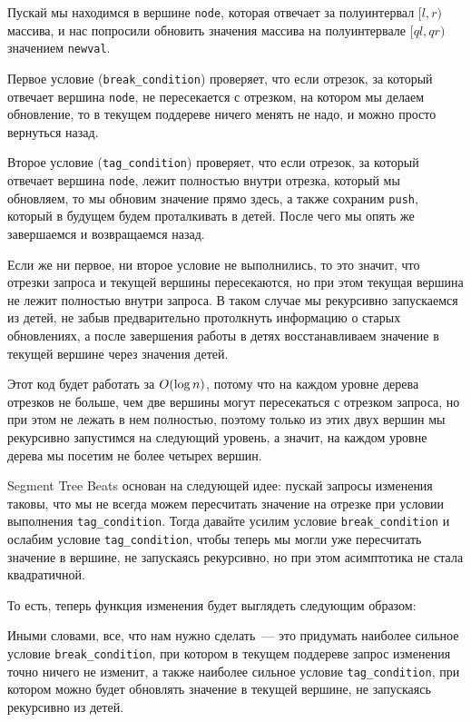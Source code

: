 

Пускай мы находимся в вершине \verb+node+, которая отвечает за полуинтервал $[l, r)$ массива, и нас попросили обновить значения массива на полуинтервале $[ql, qr)$ значением \verb+newval+.

Первое условие (\verb+break_condition+) проверяет, что если отрезок, за который отвечает вершина \verb+node+, не пересекается с отрезком, на котором мы делаем обновление, то в текущем поддереве ничего менять не надо, и можно просто вернуться назад.

Второе условие (\verb+tag_condition+) проверяет, что если отрезок, за который отвечает вершина \verb+node+, лежит полностью внутри отрезка, который мы обновляем, то мы обновим значение прямо здесь, а также сохраним \verb+push+, который в будущем будем проталкивать в детей. После чего мы опять же завершаемся и возвращаемся назад.

Если же ни первое, ни второе условие не выполнились, то это значит, что отрезки запроса и текущей вершины пересекаются, но при этом текущая вершина не лежит полностью внутри запроса. В таком случае мы рекурсивно запускаемся из детей, не забыв предварительно протолкнуть информацию о старых обновлениях, а после завершения работы в детях восстанавливаем значение в текущей вершине через значения детей.

Этот код будет работать за $O(\log n)$, потому что на каждом уровне дерева отрезков не больше, чем две вершины могут пересекаться с отрезком запроса, но при этом не лежать в нем полностью, поэтому только из этих двух вершин мы рекурсивно запустимся на следующий уровень, а значит, на каждом уровне дерева мы посетим не более четырех вершин.

Segment Tree Beats основан на следующей идее: пускай запросы изменения таковы, что мы не всегда можем пересчитать значение на отрезке при условии выполнения \verb+tag_condition+. Тогда давайте усилим условие \verb+break_condition+ и ослабим условие \verb+tag_condition+, чтобы теперь мы могли уже пересчитать значение в вершине, не запускаясь рекурсивно, но при этом асимптотика не стала квадратичной.

То есть, теперь функция изменения будет выглядеть следующим образом:



Иными словами, все, что нам нужно сделать~--- это придумать наиболее сильное условие \verb+break_condition+, при котором в текущем поддереве запрос изменения точно ничего не изменит, а также наиболее сильное условие \verb+tag_condition+, при котором можно будет обновлять значение в текущей вершине, не запускаясь рекурсивно из детей.

